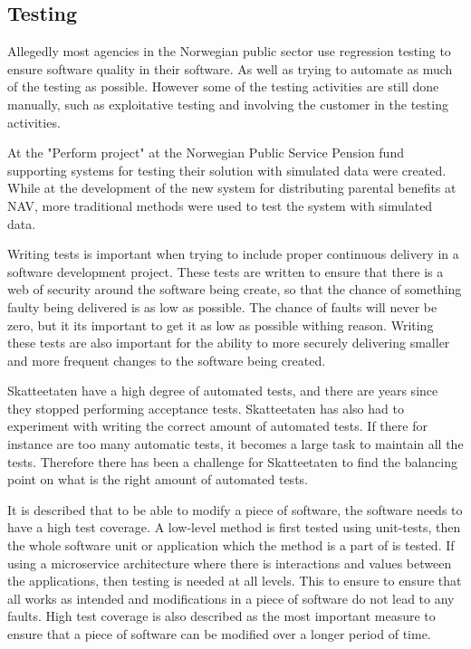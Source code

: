 
\subsection{Testing}
Allegedly most agencies in the Norwegian public sector use regression testing to ensure software quality in their software. As well as trying to automate as much of the testing as possible. However some of the testing activities are still done manually, such as exploitative testing and involving the customer in the testing activities. 

At the "Perform project" at the Norwegian Public Service Pension fund supporting systems for testing their solution with simulated data were created. While at the development of the new system for distributing parental benefits at NAV, more traditional methods were used to test the system with simulated data.

Writing tests is important when trying to include proper continuous delivery in a software development project. These tests are written to ensure that there is a web of security around the software being create, so that the chance of something faulty being delivered is as low as possible. The chance of faults will never be zero, but it its important to get it as low as possible withing reason. Writing these tests are also important for the ability to more securely delivering smaller and more frequent changes to the software being created.

Skatteetaten have a high degree of automated tests, and there are years since they stopped performing acceptance tests. Skatteetaten has also had to experiment with writing the correct amount of automated tests. If there for instance are too many automatic tests, it becomes a large task to maintain all the tests. Therefore there has been a challenge for Skatteetaten to find the balancing point on what is the right amount of automated tests.

It is described that to be able to modify a piece of software, the software needs to have a high test coverage. A low-level method is first tested using unit-tests, then the whole software unit or application which the method is a part of is tested. If using a microservice architecture where there is interactions and values between the applications, then testing is needed at all levels. This to ensure to ensure that all works as intended and modifications in a piece of software do not lead to any faults. High test coverage is also described as the most important measure to ensure that a piece of software can be modified over a longer period of time.

